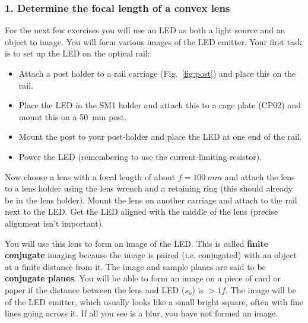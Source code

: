 \documentclass[a4paper]{report}
\begin{document}
\clearpage




\subsubsection{1. Determine the focal length of a convex lens }
For the next few exercises you will use an LED as both a light source and an object to image.
You will form various images of the LED emitter. 
Your first task is to set up the LED on the optical rail:

\begin{itemize}
\item Attach a post holder to a rail carriage (Fig.~\ref{fig:post}) and place this on the rail. 
\item Place the LED in the SM1 holder and attach this to a cage plate (CP02) and mount this on a 50~mm post. 
\item Mount the post to your post-holder and place the LED at one end of the rail.
\item Power the LED (remembering to use the current-limiting resistor). 
\end{itemize}


Now choose a lens with a focal length of about $f=100~mm$ and attach the lens to a lens holder using the lens wrench and a retaining ring (this should already be in the lens holder).
Mount the lens on another carriage and attach to the rail next to the LED. 
Get the LED aligned with the middle of the lens (precise alignment isn't important). 

You will use this lens to form an image of the LED.
This is called \textbf{finite conjugate} imaging because the image is paired (i.e. conjugated) with an object at a finite distance from it.
The image and sample planes are said to be \textbf{conjugate planes}.
You will be able to form an image on a piece of card or paper if the distance between the lens and LED ($s_o$) is $>1f$.
The image will be of the LED emitter, which  usually looks like a small bright square, often with fine lines going across it. 
If all you see is a blur, you have not formed an image.
\end{document}
